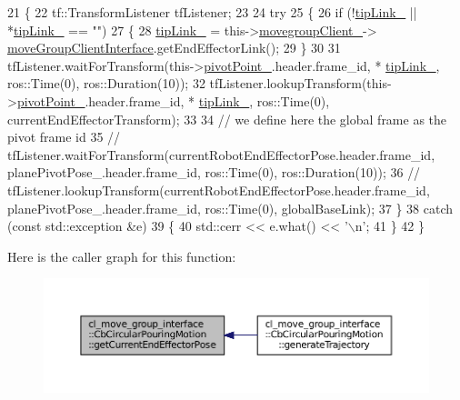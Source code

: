 \begin{DoxyCode}
21     \{
22         tf::TransformListener tfListener;
23 
24         \textcolor{keywordflow}{try}
25         \{
26             \textcolor{keywordflow}{if} (!\hyperlink{classcl__move__group__interface_1_1CbMoveEndEffectorTrajectory_a24c6c30b9b0761a61fa002d947bd3e11}{tipLink\_} || *\hyperlink{classcl__move__group__interface_1_1CbMoveEndEffectorTrajectory_a24c6c30b9b0761a61fa002d947bd3e11}{tipLink\_} == \textcolor{stringliteral}{""})
27             \{
28                 \hyperlink{classcl__move__group__interface_1_1CbMoveEndEffectorTrajectory_a24c6c30b9b0761a61fa002d947bd3e11}{tipLink\_} = this->\hyperlink{classcl__move__group__interface_1_1CbMoveEndEffectorTrajectory_aea650d3e7836125b32be97392b71a7f3}{movegroupClient\_}->
      \hyperlink{classcl__move__group__interface_1_1ClMoveGroup_a92922ea689e4e1b7b91512c56629c95b}{moveGroupClientInterface}.getEndEffectorLink();
29             \}
30 
31             tfListener.waitForTransform(this->\hyperlink{classcl__move__group__interface_1_1CbCircularPouringMotion_a4c100d8ba3e57f7ddfb614017d115fca}{pivotPoint\_}.header.frame\_id, *
      \hyperlink{classcl__move__group__interface_1_1CbMoveEndEffectorTrajectory_a24c6c30b9b0761a61fa002d947bd3e11}{tipLink\_}, ros::Time(0), ros::Duration(10));
32             tfListener.lookupTransform(this->\hyperlink{classcl__move__group__interface_1_1CbCircularPouringMotion_a4c100d8ba3e57f7ddfb614017d115fca}{pivotPoint\_}.header.frame\_id, *
      \hyperlink{classcl__move__group__interface_1_1CbMoveEndEffectorTrajectory_a24c6c30b9b0761a61fa002d947bd3e11}{tipLink\_}, ros::Time(0), currentEndEffectorTransform);
33 
34             \textcolor{comment}{// we define here the global frame as the pivot frame id}
35             \textcolor{comment}{// tfListener.waitForTransform(currentRobotEndEffectorPose.header.frame\_id,
       planePivotPose\_.header.frame\_id, ros::Time(0), ros::Duration(10));}
36             \textcolor{comment}{// tfListener.lookupTransform(currentRobotEndEffectorPose.header.frame\_id,
       planePivotPose\_.header.frame\_id, ros::Time(0), globalBaseLink);}
37         \}
38         \textcolor{keywordflow}{catch} (\textcolor{keyword}{const} std::exception &e)
39         \{
40             std::cerr << e.what() << \textcolor{charliteral}{'\(\backslash\)n'};
41         \}
42     \}
\end{DoxyCode}
Here is the caller graph for this function\+:
\nopagebreak
\begin{figure}[H]
\begin{center}
\leavevmode
\includegraphics[width=350pt]{classcl__move__group__interface_1_1CbCircularPouringMotion_a0cc72cc5233ecb0c264621d4d9501b30_icgraph}
\end{center}
\end{figure}


